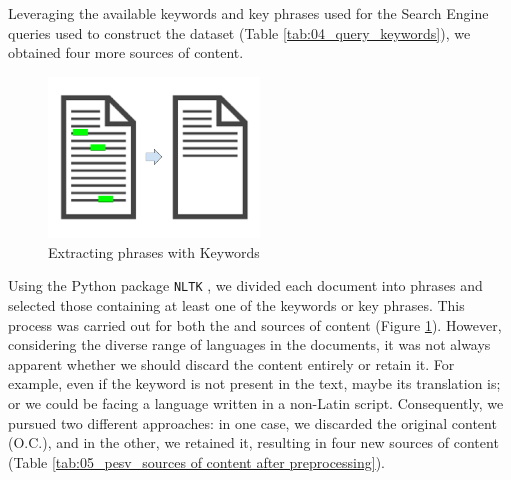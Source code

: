 


\label{vsi_leveraging_keywords}

Leveraging the available keywords and key phrases used for the Search Engine queries used to construct the dataset (Table \ref{tab:04_query_keywords}), we obtained four more sources of content. 

\begin{figure}
    \centering
    \includegraphics[width=0.5\textwidth]{Figures/05/05_keyphrase_extraction.png}
    \caption{Extracting phrases with Keywords}
    \label{fig:05_keyphrase_extraction}
\end{figure}

Using the Python package \texttt{NLTK} , we divided each document into phrases and selected those containing at least one of the keywords or key phrases. This process was carried out for both the \trafilaturaAbstract{} and \trafilaturaFulltext{} sources of content (Figure \ref{fig:05_keyphrase_extraction}). 
However, considering the diverse range of languages in the documents, it was not always apparent whether we should discard the content entirely or retain it. For example, even if the keyword is not present in the text, maybe its translation is; or we could be facing a language written in a non-Latin script.
Consequently, we pursued two different approaches: in one case, we discarded the original content (O.C.), and in the other, we retained it, resulting in four new sources of content (Table \ref{tab:05_pesv_sources of content after preprocessing}).




